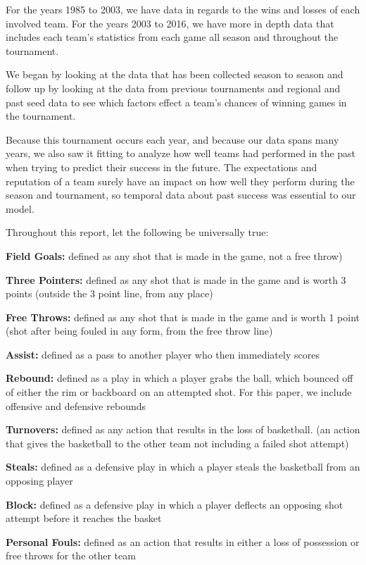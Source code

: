 \documentclass[]{scrartcl}
\begin{document}
For the years 1985 to 2003, we have data in regards to the wins and losses of each involved team. For the years 2003 to 2016, we have more in depth data that includes each team's statistics from each game all season and throughout the tournament.

We began by looking at the data that has been collected season to season and follow up by looking at the data from previous tournaments and regional and past seed data to see which factors effect a team's chances of winning games in the tournament.

Because this tournament occurs each year, and because our data spans many years, we also saw it fitting to analyze how well teams had performed in the past when trying to predict their success in the future. The expectations and reputation of a team surely have an impact on how well they perform during the season and tournament, so temporal data about past success was essential to our model.

Throughout this report, let the following be universally true:

{\textbf {Field Goals:}} defined as any shot that is made in the game, not a free throw)

{\textbf {Three Pointers:}} defined as any shot that is made in the game and is worth 3 points (outside the 3 point line, from any place)

{\textbf {Free Throws:}} defined as any shot that is made in the game and is worth 1 point (shot after being fouled in any form, from the free throw line)

{\textbf {Assist:}} defined as a pass to another player who then immediately scores

{\textbf {Rebound:}} defined as a play in which a player grabs the ball, which bounced off of either the rim or backboard on an attempted shot. For this paper, we include offensive and defensive rebounds

{\textbf {Turnovers:}} defined as any action that results in the loss of basketball. (an action that gives the basketball to the other team not including a failed shot attempt)

{\textbf {Steals:}} defined as a defensive play in which a player steals the basketball from an opposing player

{\textbf {Block:}} defined as a defensive play in which a player deflects an opposing shot attempt before it reaches the basket

{\textbf {Personal Fouls:}} defined as an action that results in either a loss of possession or free throws for the other team
\end{document}
